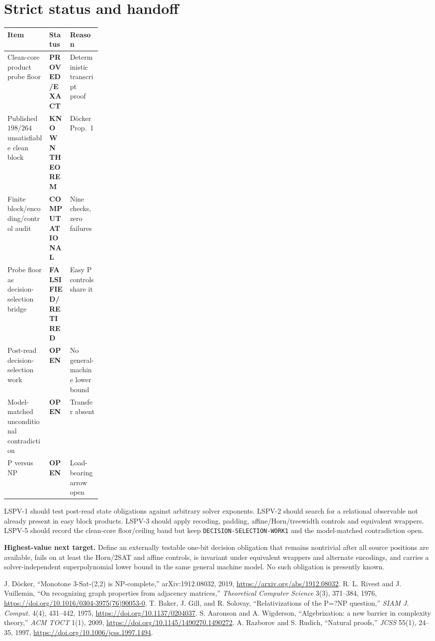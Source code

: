 \documentclass[11pt]{article}
\newcommand{\EXACT}{\textbf{PROVED/EXACT}}
\newcommand{\KNOWN}{\textbf{KNOWN THEOREM}}
\newcommand{\COMP}{\textbf{COMPUTATIONAL}}
\newcommand{\OPEN}{\textbf{OPEN}}
\newcommand{\RET}{\textbf{FALSIFIED/RETIRED}}
\begin{document}
\section{Strict status and handoff}
\begin{center}
\begin{tabularx}{0.98\linewidth}{Xp{0.22\linewidth}X}
\toprule Item & Status & Reason\\ \midrule
Clean-core product probe floor & \EXACT & Deterministic transcript proof\\
Published \(198/264\) unsatisfiable clean block & \KNOWN & Döcker Prop.~1\\
Finite block/encoding/control audit & \COMP & Nine checks, zero failures\\
Probe floor as decision-selection bridge & \RET & Easy P controls share it\\
Post-read decision-selection work & \OPEN & No general-machine lower bound\\
Model-matched unconditional contradiction & \OPEN & Transfer absent\\
P versus NP & \OPEN & Load-bearing arrow open\\ \bottomrule
\end{tabularx}
\end{center}

LSPV-1 should test post-read state obligations against arbitrary solver
exponents.  LSPV-2 should search for a relational observable not already
present in easy block products.  LSPV-3 should apply recoding, padding,
affine/Horn/treewidth controls and equivalent wrappers.  LSPV-5 should record
the clean-core floor/ceiling band but keep \texttt{DECISION-SELECTION-WORK1}
and the model-matched contradiction open.

\textbf{Highest-value next target.} Define an externally testable one-bit
decision obligation that remains nontrivial after all source positions are
available, fails on at least the Horn/2SAT and affine controls, is invariant
under equivalent wrappers and alternate encodings, and carries a
solver-independent superpolynomial lower bound in the same general machine
model.  No such obligation is presently known.

\begin{thebibliography}{99}
 J. Döcker, ``Monotone 3-Sat-(2,2) is NP-complete,''
arXiv:1912.08032, 2019, \url{https://arxiv.org/abs/1912.08032}.
 R. L. Rivest and J. Vuillemin, ``On recognizing graph
properties from adjacency matrices,'' \emph{Theoretical Computer Science}
3(3), 371--384, 1976,
\url{https://doi.org/10.1016/0304-3975(76)90053-0}.
 T. Baker, J. Gill, and R. Solovay, ``Relativizations of the
P=?NP question,'' \emph{SIAM J. Comput.} 4(4), 431--442, 1975,
\url{https://doi.org/10.1137/0204037}.
 S. Aaronson and A. Wigderson, ``Algebrization: a new barrier in
complexity theory,'' \emph{ACM TOCT} 1(1), 2009,
\url{https://doi.org/10.1145/1490270.1490272}.
 A. Razborov and S. Rudich, ``Natural proofs,'' \emph{JCSS}
55(1), 24--35, 1997,
\url{https://doi.org/10.1006/jcss.1997.1494}.
\end{thebibliography}

\end{document}
